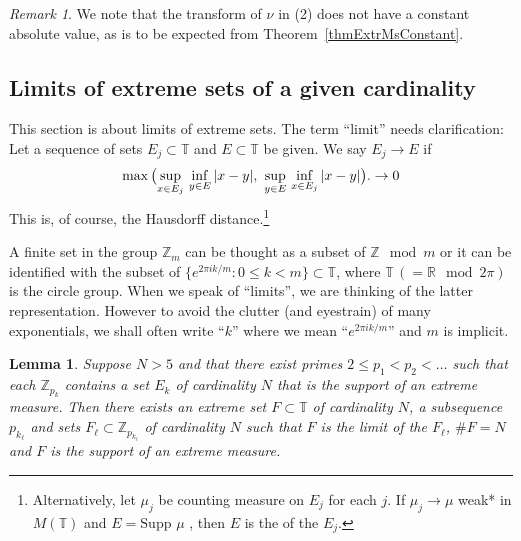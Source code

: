 \documentclass[letter,11pt]{amsart}
\numberwithin{theorem}{section}
\newtheorem{lem}[theorem]{Lemma}
\theoremstyle{remark}
\newtheorem{rem}[theorem]{Remark}
\numberwithin{equation}{section}
\newcommand{\thmref}[1]{Theorem~\ref{#1}}
\newcommand\R{{\mathbb R}}
\newcommand\Supp{\text{Supp\	}}
\newcommand{\T}{\text{$\mathbb T$}}
\newcommand{\Z}{\text{$\mathbb Z$}}
\newcommand\Zp[2]{\texttt{$\mathbb Z_{#1}^{\	#2}$}}
\begin{document}
\begin{rem}
We note that the transform of  $\nu $  in (2) does not
have a constant absolute value, as is to
 be expected from \thmref{thmExtrMsConstant}.
\end{rem}


\subsection{Limits of  extreme sets of a given cardinality}
\label{subsecInfiniteNumOfSets}
This section is about limits of   extreme sets. The term ``limit'' needs clarification:
Let a sequence of sets $E_j\subset\T$ and $E\subset\T$ be given. We say $E_j\to E$
if
\[
\max\big{(}{\sup_{x\in E_j}\,\inf_{y\in E}|x-y|,\ \sup_{y\in E}\,\inf_{x\in E_j}|x-y|}{\big)}.
\to0
\] 
This is, of course, the Hausdorff distance.\footnote{Alternatively, let  $\mu_j$ be counting measure on $E_j$ for each $j$.
If $\mu_j\to\mu$ weak* in $M(\T)$ and $E=\Supp \mu$%
, then
$E$ is the of the $E_j$.}

A finite set in the group \Zp m{} can be thought as a subset of $\Z \mod m$ or it can be
identified with the subset of $\{e^{2\pi i k/m}:0\le k<m\}\subset \T$, where $\T \,(= \R \mod 2\pi)$
is the circle group. When we speak of ``limits'',
we are thinking of the latter representation. However to avoid the clutter (and eyestrain) of
many exponentials, we shall often write ``$k$'' where we mean ``$e^{2\pi i k/m}$'' and
$m$ is implicit.

\begin{lem}\label{lemLimExtremeSet}
Suppose $N>5$ and that there exist primes $2\le p_1<p_2<\dots$
such that
each
\Zp{p_k}{} contains a set $E_k$
 of cardinality $N$ that is the support of an extreme measure.
Then there exists an extreme set $F\subset \mathbb T$ of cardinality $N$, 
a subsequence $p_{k_\ell}$ and  sets 
$F_\ell\subset\Zp{p_{k_\ell}}{}
$ of cardinality $N$ such that  $F$ is the limit of the $F_\ell$, $\#F=N$ and 
$F$ is the support of an extreme measure.
\end{lem}
\end{document}
